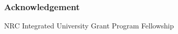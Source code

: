 \begin{frame}
  \frametitle{Acknowledgement}
        NRC Integrated University Grant Program Fellowship
\end{frame}

